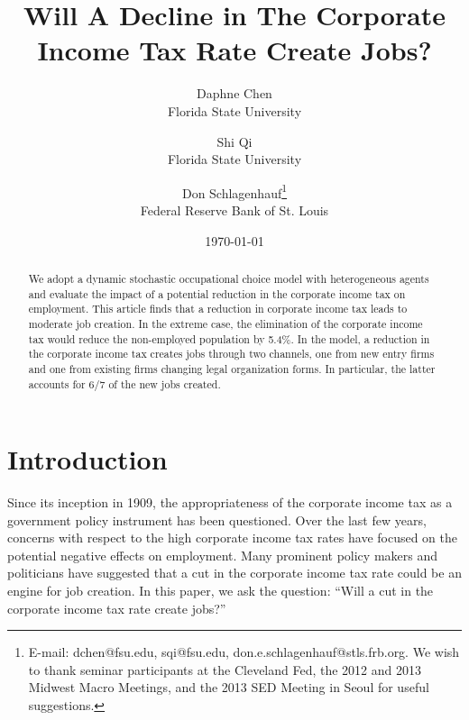 \documentclass[12pt]{article}
\begin{document}
\title{Will A Decline in The Corporate Income Tax Rate Create Jobs?\vspace{0.5cm}}

\author{Daphne Chen \\
Florida State University \and Shi Qi\\
Florida State University \vspace{0.5cm} \and Don Schlagenhauf\thanks{%
E-mail: dchen@fsu.edu, sqi@fsu.edu, don.e.schlagenhauf@stls.frb.org. We wish to thank
seminar participants at the Cleveland Fed, the 2012 and 2013 Midwest Macro Meetings, and the 2013 SED Meeting in Seoul for useful suggestions.} \\ Federal Reserve Bank of St. Louis}
\date{\vspace{0.5cm}\today }
\maketitle


\begin{abstract}

We adopt a dynamic stochastic occupational choice model with heterogeneous agents and evaluate the impact of a potential reduction in the corporate income tax on employment. This article finds that a reduction in corporate income tax leads to moderate job creation. In the extreme case, the elimination of the corporate income tax would reduce the non-employed population by 5.4\%. In the model, a reduction in the corporate income tax creates jobs through two channels, one from new entry firms and one from existing firms changing legal organization forms. In particular, the latter accounts for 6/7 of the new jobs created. 

\end{abstract}

\newpage


\onehalfspacing

\section{Introduction}

Since its inception in 1909, the appropriateness of the corporate income tax
as a government policy instrument has been questioned. Over the last few years, concerns
with respect to the high corporate income tax rates have focused on the
potential negative effects on employment. Many prominent policy makers and
politicians have suggested that a cut in the corporate income tax rate could
be an engine for job creation. In this paper, we ask the question:
``Will a cut in the corporate income tax rate create
jobs?''
\end{document}
